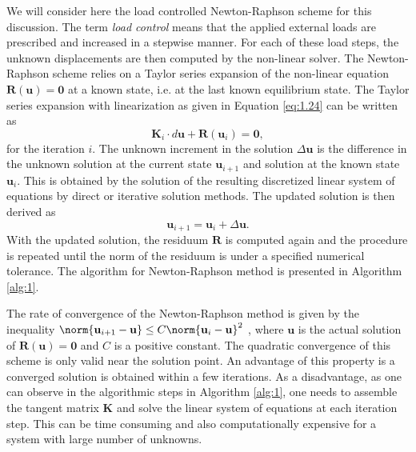We will consider here the load controlled Newton-Raphson scheme for this discussion. The term \textit{load control} means that the applied external loads are prescribed and increased in a stepwise manner. For each of these load steps, the unknown displacements are then computed by the non-linear solver. The Newton-Raphson scheme relies on a Taylor series expansion of the non-linear equation $\mathbf{R} (\mathbf{u}) = \bm{0}$ at a known state, i.e. at the last known equilibrium state. The Taylor series expansion with linearization as given in Equation \eqref{eq:1.24} can be written as 
\begin{equation}
\mathbf{K}_i \cdot d\mathbf{u} + \mathbf{R}(\mathbf{u}_i) = \bm{0},
\end{equation}
for the iteration $i$. The unknown increment in the solution $\Delta\mathbf{u}$ is the difference in the unknown solution at the current state $\mathbf{u}_{i+1}$ and solution at the known state $\mathbf{u}_i$. This is obtained by the solution of the resulting discretized linear system of equations by direct or iterative solution methods. The updated solution is then derived as 
\begin{equation}
\mathbf{u}_{i+1} = \mathbf{u}_i + \Delta\mathbf{u}.
\end{equation}
With the updated solution, the residuum $\mathbf{R}$ is computed again and the procedure is repeated until the norm of the residuum is under a specified numerical tolerance. The algorithm for Newton-Raphson method is presented in Algorithm \eqref{alg:1}. \par 

The rate of convergence of the Newton-Raphson method is given by the inequality $\norm{\mathbf{u}_{i+1} - \mathbf{u}} \leq C \norm{\mathbf{u}_i - \mathbf{u}}^2$ \cite{Wriggers2008}, where $\mathbf{u}$ is the actual solution of $\mathbf{R}(\mathbf{u}) = \mathbf{0}$ and $C$ is a positive constant. The quadratic convergence of this scheme is only valid near the solution point. An advantage of this property is a converged solution is obtained within a few iterations. As a disadvantage, as one can observe in the algorithmic steps in Algorithm \eqref{alg:1}, one needs to assemble the tangent matrix $\mathbf{K}$ and solve the linear system of equations at each iteration step. This can be time consuming and also computationally expensive for a system with large number of unknowns. \par 

